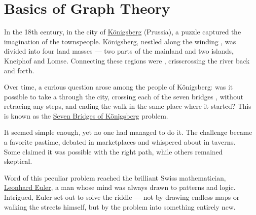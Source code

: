 \documentclass[a4paper, 12pt]{report}
\institute{\curlyquotes{\hspace{0.25mm}Sapienza} Università di Roma}
\subtitle{Appunti integrati con il libro \book}
\author{\textit{Autore}\\\authorName}
\institute{\curlyquotes{\hspace{0.25mm}Sapienza} University of Rome}
\subtitle{Lecture notes integrated with the book \book}
\author{\textit{Author}\\\authorName}
\title{\courseName}
\date{\today}
\begin{document}
    \maketitle

    {
        \hypersetup{allcolors=black}

        \romantableofcontents
    }

    \introduction


    \chapter{Basics of Graph Theory}

    In the 18th century, in the city of \href{https://en.wikipedia.org/wiki/K%C3%B6nigsberg}{Königsberg} (Prussia), a puzzle captured the imagination of the townspeople. Königsberg, nestled along the winding \tit{Pregel River}, was divided into four land masses --- two parts of the mainland and two islands, Kneiphof and Lomse. Connecting these regions were \tbf{seven bridges}, crisscrossing the river back and forth.

    Over time, a curious question arose among the people of Königsberg: was it possible to take a  through the city, crossing each of the seven bridges , without retracing any steps, and ending the walk in the same place where it started? This is known as the \href{https://en.wikipedia.org/wiki/Seven_Bridges_of_K%C3%B6nigsberg}{Seven Bridges of Königsberg} problem.

        It seemed simple enough, yet no one had managed to do it. The challenge became a favorite pastime, debated in marketplaces and whispered about in taverns. Some claimed it was possible with the right path, while others remained skeptical.


    Word of this peculiar problem reached the brilliant Swiss mathematician, \href{/}{Leonhard Euler}, a man whose mind was always drawn to patterns and logic. Intrigued, Euler set out to solve the riddle --- not by drawing endless maps or walking the streets himself, but by  the problem into something entirely new.
\end{document}
